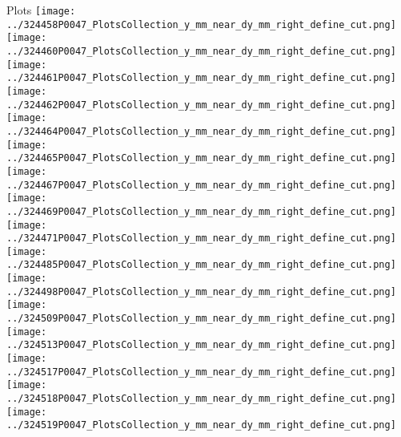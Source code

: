 \documentclass{beamer}
\begin{document}
\begin{frame}\tiny
        \begin{block}{Plots}
		  \centering
                \texttt{[image: ../324458P0047\_PlotsCollection\_y\_mm\_near\_dy\_mm\_right\_define\_cut.png]}
                \texttt{[image: ../324460P0047\_PlotsCollection\_y\_mm\_near\_dy\_mm\_right\_define\_cut.png]}
                \texttt{[image: ../324461P0047\_PlotsCollection\_y\_mm\_near\_dy\_mm\_right\_define\_cut.png]}
                \texttt{[image: ../324462P0047\_PlotsCollection\_y\_mm\_near\_dy\_mm\_right\_define\_cut.png]}
                \texttt{[image: ../324464P0047\_PlotsCollection\_y\_mm\_near\_dy\_mm\_right\_define\_cut.png]}\\
                \texttt{[image: ../324465P0047\_PlotsCollection\_y\_mm\_near\_dy\_mm\_right\_define\_cut.png]}
                \texttt{[image: ../324467P0047\_PlotsCollection\_y\_mm\_near\_dy\_mm\_right\_define\_cut.png]}
                \texttt{[image: ../324469P0047\_PlotsCollection\_y\_mm\_near\_dy\_mm\_right\_define\_cut.png]}
                \texttt{[image: ../324471P0047\_PlotsCollection\_y\_mm\_near\_dy\_mm\_right\_define\_cut.png]}
                \texttt{[image: ../324485P0047\_PlotsCollection\_y\_mm\_near\_dy\_mm\_right\_define\_cut.png]}\\
                \texttt{[image: ../324498P0047\_PlotsCollection\_y\_mm\_near\_dy\_mm\_right\_define\_cut.png]}
                \texttt{[image: ../324509P0047\_PlotsCollection\_y\_mm\_near\_dy\_mm\_right\_define\_cut.png]}
                \texttt{[image: ../324513P0047\_PlotsCollection\_y\_mm\_near\_dy\_mm\_right\_define\_cut.png]}
                \texttt{[image: ../324517P0047\_PlotsCollection\_y\_mm\_near\_dy\_mm\_right\_define\_cut.png]}
                \texttt{[image: ../324518P0047\_PlotsCollection\_y\_mm\_near\_dy\_mm\_right\_define\_cut.png]}\\
                \texttt{[image: ../324519P0047\_PlotsCollection\_y\_mm\_near\_dy\_mm\_right\_define\_cut.png]}

\end{block}
\end{frame}
\end{document}
